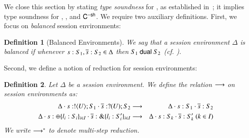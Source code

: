 \documentclass[preprint,11pt]{elsarticle}
\newtheorem{definition}{Definition}[section]
\begin{document}

We close this section  by stating  \emph{type soundness} for \HOp, as established in~\cite{KouzapasPY17}; it implies 
type soundness for \HO, \sessp, and $\mathsf{C}^{-\mathsf{sh}}$. 
We require two auxiliary definitions. First, 
we focus on \emph{balanced} session environments: 


\begin{definition}[Balanced Environments]\label{d:wtenv}%
	We say that a session environment $\Delta$ is {\em balanced} if whenever
	$s: S_1, \overline{s}: S_2 \in \Delta$ then $S_1 \ \mathsf{dual}\  S_2$ (cf. ).
\end{definition}

Second, we define a notion of reduction for session environments:

\begin{definition}%
	\label{def:ses_red}
	Let $\Delta$ be a session environment.
	We define the relation $\longrightarrow$ on session environments as:
	\begin{eqnarray*}
			\Delta \cat s: \btout{U} S_1 \cat \dual{s}: \btinp{U} S_2 & \red &
			\Delta \cat s: S_1 \cat \dual{s}: S_2\\%
			\Delta \cat s: \btsel{l_i: S_i}_{i \in I} \cat \dual{s}: \btbra{l_i: S_i'}_{i \in I} &\red& 
			 \Delta \cat s: S_k \cat \dual{s}: S_k' \ (k \in I)
		\end{eqnarray*}
We write $\longrightarrow^\ast$ to denote multi-step reduction.
\end{definition}
\end{document}
